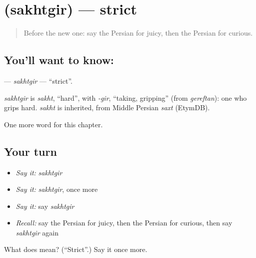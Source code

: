 \section[\texorpdfstring{\fa{سختگیر} (sakhtgir)}{سختگیر (sakhtgir)}]{ (sakhtgir) — strict}

\label{lesson:FA-C238-sakhtgir}



\begin{quote}
Before the new one: say the Persian for juicy, then the Persian for curious.
\end{quote}

\subsection*{You'll want to know: }
\textbf{} — \emph{sakhtgir} — \textquotedblleft{}strict\textquotedblright{}.

\begin{cousinweb}
\emph{sakhtgir} is \emph{sakht}, \textquotedblleft{}hard\textquotedblright{}, with \emph{-gir}, \textquotedblleft{}taking, gripping\textquotedblright{} (from \emph{gereftan}): one who grips hard. \emph{sakht} is inherited, from Middle Persian \emph{saxt} (EtymDB).
\end{cousinweb}

\begin{grammarlens}[title={What you've built}]
One more word for this chapter.
\end{grammarlens}

\subsection*{Your turn}
\begin{itemize}
\raggedright
  \item \emph{Say it:} \emph{sakhtgir}
  \item \emph{Say it:} \emph{sakhtgir}, once more
  \item \emph{Say it:} say \emph{sakhtgir}
  \item \emph{Recall:} say the Persian for juicy, then the Persian for curious, then say \emph{sakhtgir} again
\end{itemize}

\begin{tcolorbox}[breakable,colback=teal!4,colframe=teal!35!black,title={Before you move on}]
What does  mean? (\textquotedblleft{}Strict\textquotedblright{}.) Say it once more.
\end{tcolorbox}
